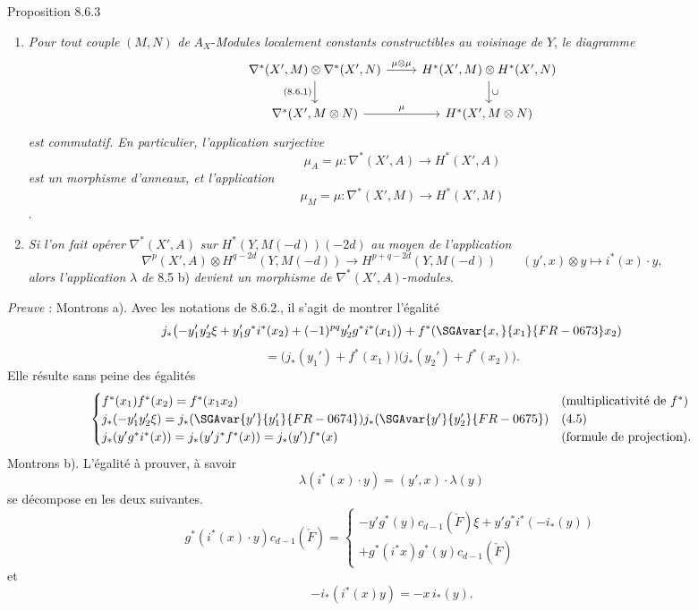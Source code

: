 \begin{statement}{Proposition 8.6.3}
\begin{enumerate}[label=\alph*)]
\item \emph{Pour tout couple} $(M,N)$ \emph{de} $A_X$-\emph{Modules localement constants constructibles au voisinage de} $Y$, \emph{le diagramme}
\[
\begin{tikzcd}
\nabla^*(X',M)\otimes\nabla^*(X',N)\arrow[r,"\mu\otimes\mu"]\arrow[d,"{(8.6.1)}"']&
H^*(X',M)\otimes H^*(X',N)\arrow[d,"\cup"]\\
\nabla^*(X',M\otimes N)\arrow[r,"\mu"]&
H^*(X',M\otimes N)
\end{tikzcd}
\]
\emph{est commutatif. En particulier, l'application surjective}
\[
\mu_A=\mu:\nabla^*(X',A)\to H^*(X',A)
\]
\emph{est un morphisme d'anneaux, et l'application}
\[
\mu_M=\mu:\nabla^*(X',M)\to H^*(X',M)
\]
.
\item \emph{Si l'on fait opérer} $\nabla^*(X',A)$ \emph{sur} $H^*(Y,M(-d))(-2d)$ \emph{au moyen de l'application}
\[
\nabla^p(X',A)\otimes H^{q-2d}(Y,M(-d))
\to H^{p+q-2d}(Y,M(-d))
\qquad
(y',x)\otimes y\mapsto i^*(x)\cdot y,
\]
\emph{alors l'application} $\lambda$ \emph{de} 8.5 b) \emph{devient un morphisme de} $\nabla^*(X',A)$-\emph{modules}.
\end{enumerate}
\end{statement}

\emph{Preuve} : Montrons a). Avec les notations de 8.6.2., il s'agit de montrer l'égalité
\[
j_*\bigl(-y_1'y_2'\xi+y_1'g^*i^*(x_2)+(-1)^{pq}y_2'g^*i^*(x_1)\bigr)+f^*(\SGAvar{x,}{x_1}{FR-0673}x_2)
\]
\[
=\bigl(j_*(y_1')+f^*(x_1)\bigr)\bigl(j_*(y_2')+f^*(x_2)\bigr).
\]
Elle résulte sans peine des égalités
\[
\begin{cases}
f^*(x_1)f^*(x_2)=f^*(x_1x_2)&\text{(multiplicativité de }f^*\text{)}\\
j_*(-y_1'y_2'\xi)=j_*(\SGAvar{y'}{y_1'}{FR-0674})j_*(\SGAvar{y'}{y_2'}{FR-0675})&\text{(4.5)}\\
j_*(y'g^*i^*(x))=j_*(y'j^*f^*(x))=j_*(y')f^*(x)&\text{(formule de projection)}.
\end{cases}
\]
Montrons b). L'égalité à prouver, à savoir
\[
\lambda(i^*(x)\cdot y)=(y',x)\cdot\lambda(y)
\]
se décompose en les deux suivantes.
\[
g^*(i^*(x)\cdot y)c_{d-1}(\check F)
=
\begin{cases}
-y'g^*(y)c_{d-1}(\check F)\xi+y'g^*i^*(-i_*(y))\\
+g^*(i^*x)g^*(y)c_{d-1}(\check F)
\end{cases}
\]
et
\[
-i_*(i^*(x)y)=-x\,i_*(y).
\]

